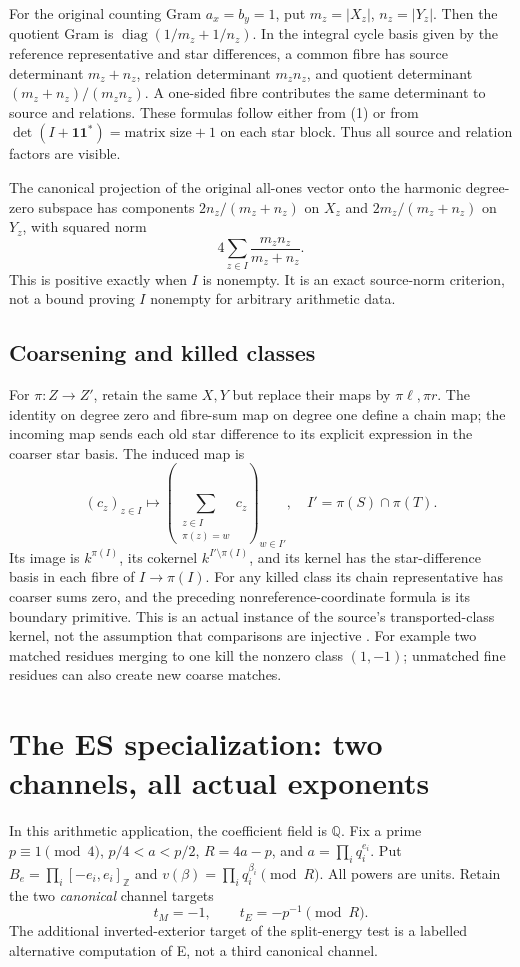 For the original counting Gram $a_x=b_y=1$, put $m_z=|X_z|$, $n_z=|Y_z|$.
Then the quotient Gram is $\operatorname{diag}(1/m_z+1/n_z)$.
In the integral cycle basis given by the reference representative and
star differences, a common fibre has source determinant $m_z+n_z$,
relation determinant $m_zn_z$, and quotient determinant
$(m_z+n_z)/(m_zn_z)$. A one-sided fibre contributes the same determinant
to source and relations. These formulas follow either from (1) or from
$\det(I+\mathbf1\mathbf1^*)=\text{matrix size}+1$ on each star block.
Thus all source and relation factors are visible.

The canonical projection of the original all-ones vector onto the
harmonic degree-zero subspace has components
$2n_z/(m_z+n_z)$ on $X_z$ and $2m_z/(m_z+n_z)$ on $Y_z$, with squared norm
\[
 \boxed{4\sum_{z\in I}\frac{m_zn_z}{m_z+n_z}.}       \tag{6}
\]
This is positive exactly when $I$ is nonempty. It is an exact source-norm
criterion, not a bound proving $I$ nonempty for arbitrary arithmetic data.

\subsection{Coarsening and killed classes}
For $\pi:Z\to Z'$, retain the same $X,Y$ but replace their maps by
$\pi\ell,\pi r$. The identity on degree zero and fibre-sum map on degree
one define a chain map; the incoming map sends each old star difference
to its explicit expression in the coarser star basis. The induced map is
\[
 (c_z)_{z\in I}\longmapsto
 \left(\sum_{\substack{z\in I\\\pi(z)=w}}c_z\right)_{w\in I'},
 \quad I'=\pi(S)\cap\pi(T).                         \tag{7}
\]
Its image is $k^{\pi(I)}$, its cokernel $k^{I'\setminus\pi(I)}$, and its
kernel has the star-difference basis in each fibre of $I\to\pi(I)$.
For any killed class its chain representative has coarser sums zero, and
the preceding nonreference-coordinate formula is its boundary primitive.
This is an actual instance of the source's transported-class kernel,
not the assumption that comparisons are injective \cite[\S3]{Derived}.
For example two matched residues merging to one kill the nonzero class
$(1,-1)$; unmatched fine residues can also create new coarse matches.

\section{The ES specialization: two channels, all actual exponents}
In this arithmetic application, the coefficient field is $\mathbb Q$.
Fix a prime $p\equiv1\pmod4$, $p/4<a<p/2$, $R=4a-p$, and
$a=\prod_iq_i^{e_i}$. Put $B_e=\prod_i[-e_i,e_i]_{\mathbb Z}$ and
$v(\beta)=\prod_iq_i^{\beta_i}\pmod R$. All powers are units.
Retain the two \emph{canonical} channel targets
\[
 t_M=-1,\qquad t_E=-p^{-1}\pmod R.                  \tag{8}
\]
The additional inverted-exterior target of the split-energy test is a
labelled alternative computation of E, not a third canonical channel.

